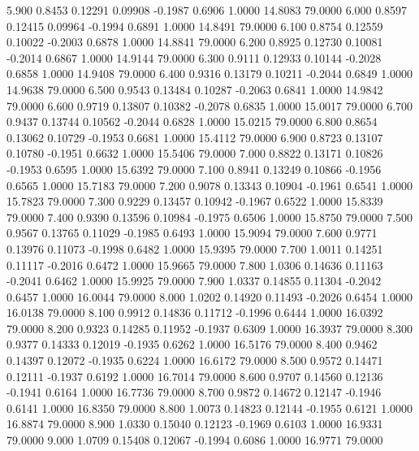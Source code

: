    5.900   0.8453   0.12291   0.09908  -0.1987   0.6906   1.0000  14.8083  79.0000
   6.000   0.8597   0.12415   0.09964  -0.1994   0.6891   1.0000  14.8491  79.0000
   6.100   0.8754   0.12559   0.10022  -0.2003   0.6878   1.0000  14.8841  79.0000
   6.200   0.8925   0.12730   0.10081  -0.2014   0.6867   1.0000  14.9144  79.0000
   6.300   0.9111   0.12933   0.10144  -0.2028   0.6858   1.0000  14.9408  79.0000
   6.400   0.9316   0.13179   0.10211  -0.2044   0.6849   1.0000  14.9638  79.0000
   6.500   0.9543   0.13484   0.10287  -0.2063   0.6841   1.0000  14.9842  79.0000
   6.600   0.9719   0.13807   0.10382  -0.2078   0.6835   1.0000  15.0017  79.0000
   6.700   0.9437   0.13744   0.10562  -0.2044   0.6828   1.0000  15.0215  79.0000
   6.800   0.8654   0.13062   0.10729  -0.1953   0.6681   1.0000  15.4112  79.0000
   6.900   0.8723   0.13107   0.10780  -0.1951   0.6632   1.0000  15.5406  79.0000
   7.000   0.8822   0.13171   0.10826  -0.1953   0.6595   1.0000  15.6392  79.0000
   7.100   0.8941   0.13249   0.10866  -0.1956   0.6565   1.0000  15.7183  79.0000
   7.200   0.9078   0.13343   0.10904  -0.1961   0.6541   1.0000  15.7823  79.0000
   7.300   0.9229   0.13457   0.10942  -0.1967   0.6522   1.0000  15.8339  79.0000
   7.400   0.9390   0.13596   0.10984  -0.1975   0.6506   1.0000  15.8750  79.0000
   7.500   0.9567   0.13765   0.11029  -0.1985   0.6493   1.0000  15.9094  79.0000
   7.600   0.9771   0.13976   0.11073  -0.1998   0.6482   1.0000  15.9395  79.0000
   7.700   1.0011   0.14251   0.11117  -0.2016   0.6472   1.0000  15.9665  79.0000
   7.800   1.0306   0.14636   0.11163  -0.2041   0.6462   1.0000  15.9925  79.0000
   7.900   1.0337   0.14855   0.11304  -0.2042   0.6457   1.0000  16.0044  79.0000
   8.000   1.0202   0.14920   0.11493  -0.2026   0.6454   1.0000  16.0138  79.0000
   8.100   0.9912   0.14836   0.11712  -0.1996   0.6444   1.0000  16.0392  79.0000
   8.200   0.9323   0.14285   0.11952  -0.1937   0.6309   1.0000  16.3937  79.0000
   8.300   0.9377   0.14333   0.12019  -0.1935   0.6262   1.0000  16.5176  79.0000
   8.400   0.9462   0.14397   0.12072  -0.1935   0.6224   1.0000  16.6172  79.0000
   8.500   0.9572   0.14471   0.12111  -0.1937   0.6192   1.0000  16.7014  79.0000
   8.600   0.9707   0.14560   0.12136  -0.1941   0.6164   1.0000  16.7736  79.0000
   8.700   0.9872   0.14672   0.12147  -0.1946   0.6141   1.0000  16.8350  79.0000
   8.800   1.0073   0.14823   0.12144  -0.1955   0.6121   1.0000  16.8874  79.0000
   8.900   1.0330   0.15040   0.12123  -0.1969   0.6103   1.0000  16.9331  79.0000
   9.000   1.0709   0.15408   0.12067  -0.1994   0.6086   1.0000  16.9771  79.0000
